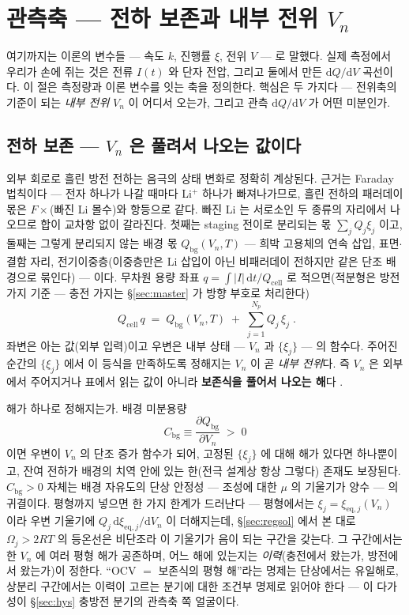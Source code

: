 \documentclass[11pt,a4paper]{article}
\newcommand{\dd}{\mathrm{d}}
\newcommand{\eq}{\mathrm{eq}}
\newcommand{\cell}{\mathrm{cell}}
\newcommand{\bg}{\mathrm{bg}}
\begin{document}
\section{관측축 — 전하 보존과 내부 전위 $V_n$}\label{sec:charge}
여기까지는 이론의 변수들 — 속도 $k$, 진행률 $\xi$, 전위 $V$ — 로 말했다. 실제 측정에서 우리가 손에 쥐는
것은 전류 $I(t)$ 와 단자 전압, 그리고 둘에서 만든 $\dd Q/\dd V$ 곡선이다. 이 절은 측정량과 이론 변수를
잇는 축을 정의한다. 핵심은 두 가지다 — 전위축의 기준이 되는 \emph{내부 전위} $V_n$ 이 어디서 오는가, 그리고
관측 $\dd Q/\dd V$ 가 어떤 미분인가.

\subsection{전하 보존 — $V_n$ 은 풀려서 나오는 값이다}
외부 회로로 흘린 방전 전하는 음극의 상태 변화로 정확히 계상된다. 근거는 Faraday 법칙이다 — 전자 하나가
나갈 때마다 Li$^+$ 하나가 빠져나가므로, 흘린 전하의 패러데이 몫은 $F\times$(빠진 Li 몰수)와 항등으로
같다. 빠진 Li 는
서로소인 두 종류의 자리에서 나오므로 합이 교차항 없이 갈라진다. 첫째는 staging 전이로 분리되는 몫
$\sum_jQ_j\xi_j$ 이고, 둘째는 그렇게 분리되지 않는 배경 몫 $Q_\bg(V_n,T)$ — 희박 고용체의 연속 삽입,
표면$\cdot$결함 자리, 전기이중층(이중층만은 Li 삽입이 아닌 비패러데이 전하지만 같은 단조 배경으로
묶인다) — 이다. 무차원 용량 좌표 $q=\int|I|\,\dd t/Q_\cell$ 로 적으면(적분형은 방전 가지 기준 —
충전 가지는 \S\ref{sec:master} 가 방향 부호로 처리한다)
\begin{equation}
\boxed{\;Q_\cell\,q\;=\;Q_\bg(V_n,T)\;+\;\sum_{j=1}^{N_p}Q_j\,\xi_j\;.}
\label{eq:charge}
\end{equation}
좌변은 아는 값(외부 입력)이고 우변은 내부 상태 — $V_n$ 과 $\{\xi_j\}$ — 의 함수다. 주어진 순간의
$\{\xi_j\}$ 에서 이 등식을 만족하도록 정해지는 $V_n$ 이 곧 \emph{내부 전위}다. 즉 $V_n$ 은 외부에서
주어지거나 표에서 읽는 값이 아니라 \textbf{보존식을 풀어서 나오는 해}다 \cite{mckinnon1983,newman2004}.

해가 하나로 정해지는가. 배경 미분용량
\begin{equation}
C_\bg\equiv\frac{\partial Q_\bg}{\partial V_n}\;>\;0
\label{eq:cbg}
\end{equation}
이면 우변이 $V_n$ 의 단조 증가 함수가 되어, 고정된 $\{\xi_j\}$ 에 대해 해가 있다면 하나뿐이고, 잔여
전하가 배경의 치역 안에 있는 한(전극 설계상 항상 그렇다) 존재도 보장된다.
$C_\bg>0$ 자체는 배경 자유도의 단상 안정성 — 조성에 대한 $\mu$ 의 기울기가 양수 — 의 귀결이다. 평형까지 넣으면
한 가지 한계가 드러난다 — 평형에서는 $\xi_j=\xi_{\eq,j}(V_n)$ 이라 우변 기울기에
$Q_j\,\dd\xi_{\eq,j}/\dd V_n$ 이 더해지는데, \S\ref{sec:regsol} 에서 본 대로 $\Omega_j>2RT$ 의
등온선은 비단조라 이 기울기가 음이 되는 구간을 갖는다. 그 구간에서는 한 $V_n$ 에 여러 평형 해가 공존하며,
어느 해에 있는지는 \emph{이력}(충전에서 왔는가, 방전에서 왔는가)이 정한다. ``OCV $=$ 보존식의 평형 해''라는
명제는 단상에서는 유일해로, 상분리 구간에서는 이력이 고르는 분기에 대한 조건부 명제로 읽어야 한다 — 이
다가성이 \S\ref{sec:hys} 충방전 분기의 관측축 쪽 얼굴이다.
\end{document}

